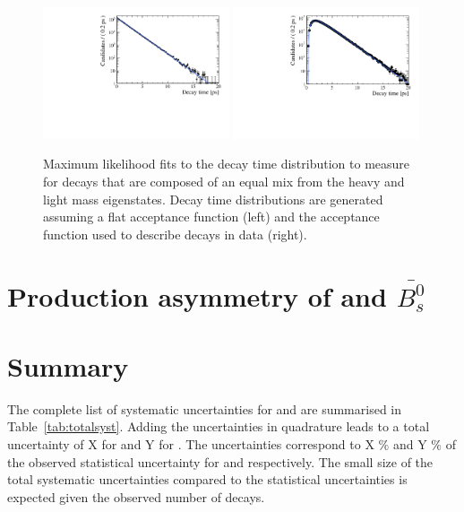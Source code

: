 \begin{figure}[htbp]
  \centering
    \includegraphics[width=0.49\textwidth]{./Figs/LifetimeSystematics/No_acc_fit.pdf}
    \includegraphics[width=0.49\textwidth]{./Figs/LifetimeSystematics/Acc_fit.pdf}
  \caption{Maximum likelihood fits to the decay time distribution to measure \tmumu for \bsmumu decays that are composed of an equal mix from the heavy and light mass eigenstates. Decay time distributions are generated assuming a flat acceptance function (left) and the acceptance function used to describe \bsmumu decays in data (right).}
  \label{fig:mixofstates}
\end{figure}


\section{Production asymmetry of \bs and $\bar{B_{s}^{0}}$}
\label{sec:productionasymetry}

\section{Summary}
\label{sec:systematicsSummary}

The complete list of systematic uncertainties for \tmumu and \Gmumu are summarised in Table~\ref{tab:totalsyst}. Adding the uncertainties in quadrature leads to a total uncertainty of X for \tmumu and Y for \Gmumu. The uncertainties correspond to X $\%$ and Y $\%$ of the observed statistical uncertainty for \tmumu and \Gmumu respectively. The small size of the total systematic uncertainties compared to the statistical uncertainties is expected given the observed number of decays. 

